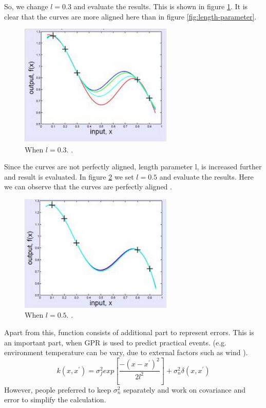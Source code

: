 So, we change $l=0.3$ and evaluate the results. This is shown in figure \ref{fig:length-parameter-03}. It is clear that the curves are more aligned here than in figure \ref{fig:length-parameter}.
\begin{figure}[here]
  \centering
      \includegraphics[width=0.65\textwidth]{theory/graphics/effects-of-l-03.png}
  \caption{When $l = 0.3$. \cite{length-parameter}. }
  \label{fig:length-parameter-03}
\end{figure}
Since the curves are not perfectly aligned, length parameter l, is increased further and result is evaluated. In figure \ref{fig:length-parameter-05} we set $l=0.5$ and evaluate the results. Here we can observe that the curves are perfectly aligned \cite{length-parameter}.
\begin{figure}[here]
  \centering
      \includegraphics[width=0.65\textwidth]{theory/graphics/effects-of-l-05.png}
  \caption{When $l = 0.5$. \cite{length-parameter}. }
  \label{fig:length-parameter-05}
\end{figure}
Apart from this, function consists of additional part to represent errors. This is an important part, when GPR is used to predict practical events. (e.g. environment temperature can be vary, due to external factors such as wind ).
\begin{equation}
k(x,x^{'})=\sigma_{f}^{2}exp\left[ \dfrac{-(x-x^{'})^{2}}{2l^{2}} \right] + \sigma_{n}^{2}\delta(x,x^{'})
\label{eq:referanceName}
\end{equation}
However, people preferred to keep $ \sigma_{n}^{2} $ separately and work on covariance and error to simplify the calculation.

